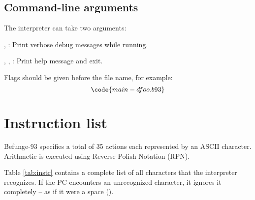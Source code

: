 \documentclass[12pt, a4paper]{article}
\begin{document}
\subsection{Command-line arguments}
\label{sec:args}

The interpreter can take two arguments:

\vspace{6pt}
\noindent
{},  : Print verbose debug messages while running.

\vspace{6pt}
\noindent
{}, ,  : Print help message and exit.

\vspace{6pt}
\noindent
Flags should be given before the file name, for example:
$$\code{main -d foo.b93}$$

\section{Instruction list}
\label{sec:instructions}

Befunge-93 specifies a total of 35 actions each represented by an ASCII character. Arithmetic is executed using Reverse Polish Notation (RPN).

Table \ref{tab:instr} contains a complete list of all characters that the interpreter recognizes. If the PC encounters an unrecognized character, it ignores it completely -- as if it were a space (\textvisiblespace).
\end{document}
